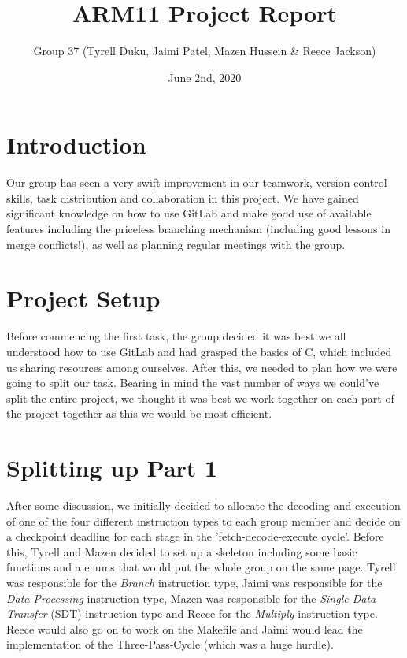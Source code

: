 \documentclass[10pt]{article}
\title{ARM11 Project Report}
\author{Group 37 (Tyrell Duku, Jaimi Patel, Mazen Hussein & Reece Jackson) }
\date{June 2nd, 2020}
\begin{document}
\section{Introduction}
Our group has seen a very swift improvement in our teamwork, version control skills, task distribution and collaboration in this project. We have gained significant knowledge on how to use GitLab and make good use of available features including the priceless branching mechanism (including good lessons in merge conflicts!), as well as planning regular meetings with the group.

\section{Project Setup}
Before commencing the first task, the group decided it was best we all understood how to use GitLab and had grasped the basics of C, which included us sharing resources among ourselves. After this, we needed to plan how we were going to split our task. Bearing in mind the vast number of ways we could've split the entire project, we thought it was best we work together on each part of the project together as this we would be most efficient.

\section{Splitting up Part 1}
After some discussion, we initially decided to allocate the decoding and execution of one of the four different instruction types to each group member and decide on a checkpoint deadline for each stage in the 'fetch-decode-execute cycle'. Before this, Tyrell and Mazen decided to set up a skeleton including some basic functions and a enums that would put the whole group on the same page. Tyrell was responsible for the \textit{Branch} instruction type, Jaimi was responsible for the \textit{Data Processing} instruction type, Mazen was responsible for the \textit{Single Data Transfer} (SDT) instruction type and Reece for the \textit{Multiply} instruction type. Reece would also go on to work on the Makefile and Jaimi would lead the implementation of the Three-Pass-Cycle (which was a huge hurdle).
\end{document}
